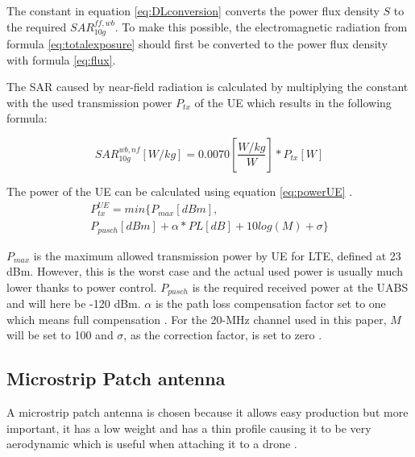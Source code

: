 \documentclass[twocolumn]{phdsymp} %
\begin{document}
The constant in equation \ref{eq:DLconversion} converts the \gls{power flux density} $S$ to the required $SAR^{ff,wb}_{10g}$.
To make this possible, the electromagnetic radiation
from formula \ref{eq:totalexposure} should first be converted to the  \gls{power flux density} with formula 
\ref{eq:flux}.

The SAR caused by near-field radiation is calculated by multiplying the constant with the used transmission
power $P_{tx}$ of the \gls{UE} which results in the following formula:

\begin{equation} 
SAR^{wb,nf}_{10g} [W/kg] = 0.0070 \left[\frac{W/kg}{W}\right] * P_{tx} [W]
\label{eq:ulToSar}
\end{equation}

The power of the \gls{UE} can be calculated using equation \ref{eq:powerUE} \cite{J22_plets2015joint}.
\begin{multline}
P_{tx}^{UE} = min \big\{P_{max} [dBm] , \\
 P_{pusch} [dBm] + \alpha * PL [dB] + 10log(M) + \sigma \big\}
 \label{eq:powerUE}
\end{multline}

$P_{max}$ is the maximum allowed transmission power by \gls{UE} for LTE, defined at 23 dBm. 
However, this is the worst case and the actual used power is usually much lower thanks to power control.
$P_{pusch}$ is the required received power at the
\gls{UABS} and will here be -120 dBm. 
$\alpha$ is the path loss compensation factor set to one which means full compensation \cite{J32,J33}.
For the 20-MHz channel used in this paper, $M$ will be set to 100 
and $\sigma$,  as the correction factor, is set to zero \cite{J22_plets2015joint,J32}.


\subsection{Microstrip Patch antenna}
A microstrip patch antenna is chosen because it allows easy production but more important, it has a low weight 
and has a thin profile causing it to be very aerodynamic which is useful when attaching it to a drone \cite{J13_microstripadvantages}.
\end{document}
